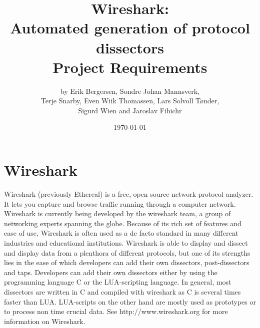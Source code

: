 \documentclass[a4paper, 11pt]{report}
\title{Wireshark:\\ Automated generation of protocol dissectors\\
		Project Requirements}
\author{by Erik Bergersen, Sondre Johan Mannsverk,\\ Terje Snarby,
		Even Wiik Thomassen, Lars Solvoll Tønder,\\ Sigurd Wien
		and Jaroslav Fibichr}
\date{\today}
\begin{document}
\section{Wireshark}
Wireshark (previously Ethereal) is a free, open source network protocol analyzer. It lets you capture and browse traffic running through a computer network. Wireshark is currently being developed by the wireshark team, a group of networking experts spanning the globe. Because of its rich set of features and ease of use, Wireshark is often used as a de facto standard in many different industries and educational institutions. Wireshark is able to display and dissect and display data from a plenthora of different protocols, but one of its strengths lies in the ease of which developers can add their own dissectors, post-dissectors and taps. Developers can add their own dissectors either by using the programming language C or the LUA-scripting language. In general, most dissectors are written in C and compiled with wireshark as C is several times faster than LUA. LUA-scripts on the other hand are mostly used as prototypes or to process non time crucial data. 
See http://www.wireshark.org for more information on Wireshark.
\end{document}
